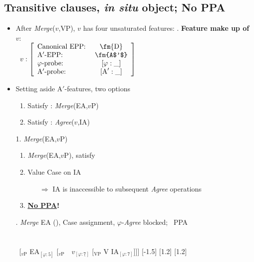 \documentclass[letterpaper,10pt]{handout_nick}
\begin{document}
\subsection{Transitive clauses, \emph{in situ} object; No PPA}
\begin{itemize}
\item After \emph{Merge}($v$,VP), $v$ has four unsaturated features:
\ex. \textbf{Feature make up of $v$}:\\
\ $v: \left[\begin{array}{lc} \text{Canonical EPP: } & \text{\fm{D}}\\
\text{A$'$-EPP:} & \text{\fm{A$'$}}\\
\text{$\varphi$-probe:} & [\varphi:\_]\\
\text{A$'$-probe:} & [\text{A}':\_]
\end{array} \right]$

\item Setting aside A$'$-features, two options
\begin{enumerate}
\item Satisfy \fm{$\varphi$}: \emph{Merge}(EA,$v$P)
\item Satisfy \fa{$\varphi$}: \emph{Agree}($v$,IA)
\end{enumerate}
\item[1.] \emph{Merge}(EA,$v$P)
\begin{enumerate}
\item \emph{Merge}(EA,$v$P), satisfy \fm{$\varphi$} 
\item Value Case on IA
\begin{itemize}
\item[$\Rightarrow$] IA is inaccessible to subsequent \emph{Agree} operations 
\end{itemize}
\item \textbf{\underline{No PPA}!}
\end{enumerate}
\ex. \emph{Merge} EA (\fms{$\varphi$}), Case assignment, $\varphi$-\emph{Agree} blocked; \xmark\ PPA \\\\\\
\ [$_\text{$v$P}$ \hspace*{-.3cm}EA$_{[\varphi:5]}$ [$_\text{$v$P}$\ \ \hspace*{-.2cm}\hspace*{-.2cm}$v_{[\varphi:\underline{7}]}$ [$_\text{VP}$ V \hspace*{-.3cm}IA$_{[\varphi:7]}$]]]
[-1.5]
[1.2]
[1.2]\\


\end{itemize}
\end{document}
